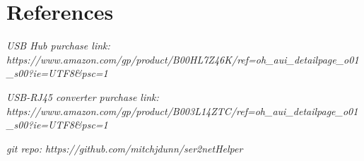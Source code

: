\documentclass[12pt]{IEEEtran}
\begin{document}
\newpage \section{References} \printbibliography[heading=none]
\textit{USB Hub purchase link: https://www.amazon.com/gp/product/B00HL7Z46K/ref=oh_aui_detailpage_o01_s00?ie=UTF8&psc=1}

\textit{USB-RJ45 converter purchase link: https://www.amazon.com/gp/product/B003L14ZTC/ref=oh_aui_detailpage_o01_s00?ie=UTF8&psc=1}


\textit{git repo: https://github.com/mitchjdunn/ser2netHelper}
\end{document}
